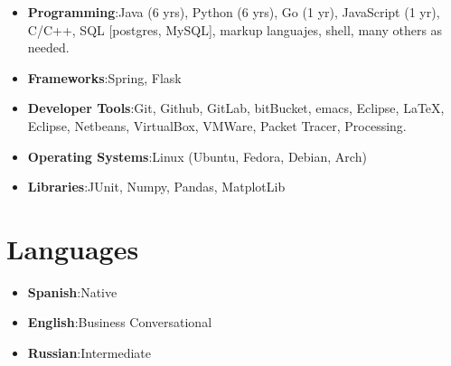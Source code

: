 \documentclass[letterpaper,
  10pt]{article}
\newcommand{\resumeHeadingSkillStart}{\begin{itemize}[leftmargin=*,itemsep=.5mm, rightmargin=2ex, label={}]}
\newcommand{\resumeHeadingSkillEnd}{\end{itemize}\vspace{-2mm}}
\newcommand{\resumeSubItem}[2]{\resumeItem{#1}{#2}\vspace{-4pt}}
\newcommand{\resumeItem}[2]{
  \item{
    \textbf{#1}{:\hspace{0.5mm}#2 \vspace{-0.5mm}}
  }
}
\begin{document}
\resumeHeadingSkillStart
  \resumeSubItem{Programming}
                {Java (6 yrs), Python (6 yrs), Go (1 yr), JavaScript (1 yr), C/C++, SQL [postgres, MySQL], markup languajes, shell, many others as needed.}
  \resumeSubItem{Frameworks}
                {Spring, Flask}
  \resumeSubItem{Developer Tools}
                {Git, Github, GitLab, bitBucket, emacs, Eclipse, \LaTeX, Eclipse, Netbeans, VirtualBox, VMWare, Packet Tracer, Processing.}
  \resumeSubItem{Operating Systems}
                {Linux (Ubuntu, Fedora, Debian, Arch)}
  \resumeSubItem{Libraries}
                {JUnit, Numpy, Pandas, MatplotLib}
\resumeHeadingSkillEnd

\section{Languages}
\resumeHeadingSkillStart
\resumeSubItem{Spanish}
                {Native}

\resumeSubItem{English}
              {Business Conversational}

\resumeSubItem{Russian}
              {Intermediate}
 \resumeHeadingSkillEnd
\end{document}

